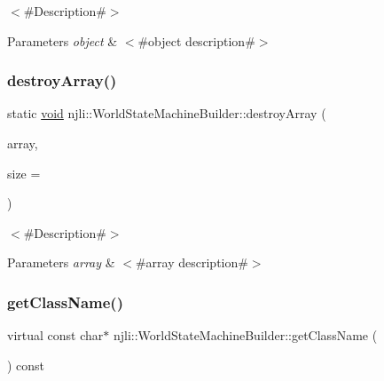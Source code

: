 $<$\#\+Description\#$>$


\begin{DoxyParams}{Parameters}
{\em object} & $<$\#object description\#$>$ \\
\hline
\end{DoxyParams}
\mbox{\label{classnjli_1_1_world_state_machine_builder_a90956bf0dd6e90e79fe29336335a75bf}} 
\subsubsection{\texorpdfstring{destroy\+Array()}{destroyArray()}}
{\footnotesize\ttfamily static \mbox{\hyperlink{_thread_8h_af1e856da2e658414cb2456cb6f7ebc66}{void}} njli\+::\+World\+State\+Machine\+Builder\+::destroy\+Array (\begin{DoxyParamCaption}\item[{\mbox{\hyperlink{classnjli_1_1_world_state_machine_builder}{World\+State\+Machine\+Builder}} $\ast$$\ast$}]{array,  }\item[{const \mbox{\hyperlink{_util_8h_a10e94b422ef0c20dcdec20d31a1f5049}{u32}}}]{size = {} }\end{DoxyParamCaption})\hspace{0.3cm}{\ttfamily [static]}}

$<$\#\+Description\#$>$


\begin{DoxyParams}{Parameters}
{\em array} & $<$\#array description\#$>$ \\
\hline
\end{DoxyParams}
\mbox{\label{classnjli_1_1_world_state_machine_builder_a23c20795eb84296c30fc813cb901f8e4}} 
\subsubsection{\texorpdfstring{get\+Class\+Name()}{getClassName()}}
{\footnotesize\ttfamily virtual const char$\ast$ njli\+::\+World\+State\+Machine\+Builder\+::get\+Class\+Name (\begin{DoxyParamCaption}{ }\end{DoxyParamCaption}) const\hspace{0.3cm}{\ttfamily [virtual]}}

